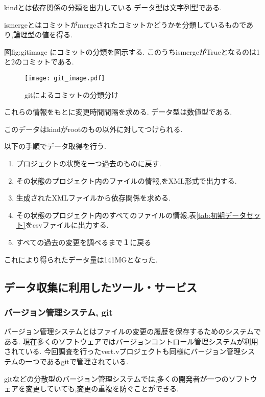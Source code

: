 \documentclass{fose2016}           %
\begin{document}
kindとは依存関係の分類を出力している.データ型は文字列型である.

ismergeとはコミットがmergeされたコミットかどうかを分類しているものであり,論理型の値を得る.

図{fig:gitimage} にコミットの分類を図示する.
このうちismergeがTrueとなるのは1と2のコミットである.

\begin{figure}[t]
\centering
\texttt{[image: git\_image.pdf]}
\caption{gitによるコミットの分類分け}
\label{fig:gitimage} 
\end{figure}


これらの情報をもとに変更時間間隔を求める.
データ型は数値型である.


このデータはkindがrootのもの以外に対してつけられる.

以下の手順でデータ取得を行う.
\begin{enumerate}
\item プロジェクトの状態を一つ過去のものに戻す.
\item その状態のプロジェクト内のファイルの情報,をXML形式で出力する.
\item 生成されたXMLファイルから依存関係を求める.
\item その状態のプロジェクト内のすべてのファイルの情報,表\ref{tab:初期データセット}をcsvファイルに出力する.
\item すべての過去の変更を調べるまで１に戻る
\end{enumerate}
これにより得られたデータ量は141MGとなった.

\subsection{データ収集に利用したツール・サービス}
\subsubsection{バージョン管理システム, git}
バージョン管理システムとはファイルの変更の履歴を保存するためのシステムである.
現在多くのソフトウェアではバージョンコントロール管理システムが利用されている.
今回調査を行ったvert.vプロジェクトも同様にバージョン管理システムの一つであるgitで管理されている.

gitなどの分散型のバージョン管理システムでは,多くの開発者が一つのソフトウェアを変更していても,変更の重複を防ぐことができる.
\end{document}
